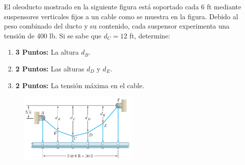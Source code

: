\documentclass[ a4paper, twoside, 11pt]{article}
\begin{document}
\begin{problem}
El oleoducto mostrado en la siguiente figura est\'a soportado cada 6 ft mediante suspensores verticales fijos a un cable como se muestra en la figura. Debido al peso combinado del ducto y su contenido, cada suspensor experimenta una tensi\'on de 400 lb. Si se sabe que $d_C = 12$ ft, determine: 
\begin{enumerate}[label=\textbf{\alph*)}]
\item \textbf{3 Puntos:} La altura $d_B$. 
\item \textbf{2 Puntos:} Las alturas $d_D$ y $d_E$. 
\item \textbf{2 Puntos:} La tensi\'on m\'axima en el cable. 
\end{enumerate}

\begin{figure}[htb]
\centering
\includegraphics[width=0.52\textwidth]{prob-cables.jpg}
\end{figure}

\end{problem}
\fullskip
\end{document}
